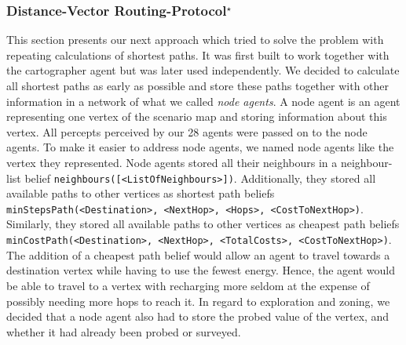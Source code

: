 \subsubsection[Distance-Vector Routing Protocol]{Distance-Vector Routing-Protocol$^\star$}\label{alg:map_dv}
This section presents our next approach which tried to solve the problem with repeating calculations of shortest paths.
It was first built to work together with the cartographer agent but was later used independently.
We decided to calculate all shortest paths as early as possible and store these paths together with other information in a network of what we called \emph{node agents}.
A node agent is an agent representing one vertex of the scenario map and storing information about this vertex.
All percepts perceived by our 28 agents were passed on to the node agents.
To make it easier to address node agents, we named node agents like the vertex they represented.
Node agents stored all their neighbours in a neighbour-list belief \texttt{neighbours([<ListOfNeighbours>])}.
Additionally, they stored all available paths to other vertices as shortest path beliefs \texttt{minStepsPath(<Destination>, <NextHop>, <Hops>, <CostToNextHop>)}.
Similarly, they stored all available paths to other vertices as cheapest path beliefs \texttt{minCostPath(<Destination>, <NextHop>, <TotalCosts>, <CostToNextHop>)}.
The addition of a cheapest path belief would allow an agent to travel towards a destination vertex while having to use the fewest energy.
Hence, the agent would be able to travel to a vertex with recharging more seldom at the expense of possibly needing more hops to reach it.
In regard to exploration and zoning, we decided that a node agent also had to store the probed value of the vertex, and whether it had already been probed or surveyed.

